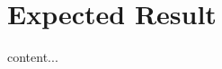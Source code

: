 \documentclass[crop=false]{standalone}
\begin{document}
	\section{Expected Result}
    content...
\end{document}
